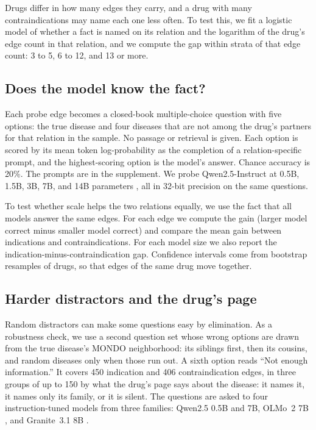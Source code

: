 \documentclass[letterpaper]{article} %
\begin{document}
Drugs differ in how many edges they carry, and a drug with many
contraindications may name each one less often. To test this, we fit a
logistic model of whether a fact is named on its relation and the logarithm of
the drug's edge count in that relation, and we compute the gap within strata of
that edge count: 3 to 5, 6 to 12, and 13 or more.

\subsection{Does the model know the fact?}

Each probe edge becomes a closed-book multiple-choice question with five
options: the true disease and four diseases that are not among the drug's
partners for that relation in the sample. No passage or retrieval is given.
Each option is scored by its mean token log-probability as the completion of a
relation-specific prompt, and the highest-scoring option is the model's answer.
Chance accuracy is 20\%. The prompts are in the supplement. We probe
Qwen2.5-Instruct at 0.5B, 1.5B, 3B, 7B, and 14B parameters
\citep{qwen2025qwen25}, all in 32-bit precision on the same questions.



To test whether scale helps the two relations equally, we use the fact that
all models answer the same edges. For each edge we compute the gain (larger
model correct minus smaller model correct) and compare the mean gain between
indications and contraindications. For each model size we also report the
indication-minus-contraindication gap. Confidence intervals come from bootstrap
resamples of drugs, so that edges of the same drug move together.

\subsection{Harder distractors and the drug's page}

Random distractors can make some questions easy by elimination. As a
robustness check, we use a second question set whose wrong options are drawn
from the true disease's MONDO neighborhood: its siblings first, then its
cousins, and random diseases only when those run out. A sixth option reads
``Not enough information.'' It covers 450 indication and 406 contraindication
edges, in three groups of up to 150 by what the drug's page says about the
disease: it names it, it names only its family, or it is silent. The questions
are asked to four instruction-tuned models from three families: Qwen2.5 0.5B
and 7B, OLMo~2 7B \citep{olmo2024olmo2}, and Granite~3.1 8B
\citep{granite2024}.
\end{document}
